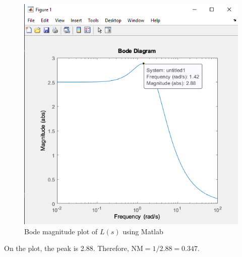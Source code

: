 \begin{figure}[h]
    \centering
    \includegraphics[width=0.5\linewidth]{Questions/Figures/Q2 Matlab Bodemag.png}
    \caption{Bode magnitude plot of $L(s)$ using Matlab}
    \label{fig:Q2 Matlab BodeMag}
\end{figure}

On the plot, the peak is 2.88. Therefore, $\boxed{\text{NM} = 1/2.88 = 0.347}$.


